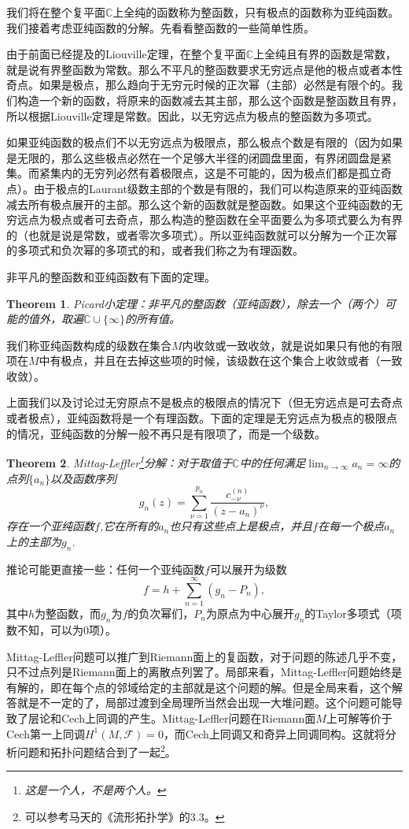 \documentclass[10pt]{book}
\theoremstyle{plain}%
\newtheorem{theo}{Theorem}[chapter]%
\begin{document}
我们将在整个复平面$\mathbb{C}$上全纯的函数称为整函数，只有极点的函数称为亚纯函数。我们接着考虑亚纯函数的分解。先看看整函数的一些简单性质。

由于前面已经提及的Liouville定理，在整个复平面$\mathbb{C}$上全纯且有界的函数是常数，就是说有界整函数为常数。那么不平凡的整函数要求无穷远点是他的极点或者本性奇点。如果是极点，那么趋向于无穷元时候的正次幂（主部）必然是有限个的。我们构造一个新的函数，将原来的函数减去其主部，那么这个函数是整函数且有界，所以根据Liouville定理是常数。因此，以无穷远点为极点的整函数为多项式。

如果亚纯函数的极点们不以无穷远点为极限点，那么极点个数是有限的（因为如果是无限的，那么这些极点必然在一个足够大半径的闭圆盘里面，有界闭圆盘是紧集。而紧集内的无穷列必然有着极限点，这是不可能的，因为极点们都是孤立奇点）。由于极点的Laurant级数主部的个数是有限的，我们可以构造原来的亚纯函数减去所有极点展开的主部。那么这个新的函数就是整函数。如果这个亚纯函数的无穷远点为极点或者可去奇点，那么构造的整函数在全平面要么为多项式要么为有界的（也就是说是常数，或者零次多项式）。所以亚纯函数就可以分解为一个正次幂的多项式和负次幂的多项式的和，或者我们称之为有理函数。

非平凡的整函数和亚纯函数有下面的定理。
\begin{theo}
Picard小定理：非平凡的整函数（亚纯函数），除去一个（两个）可能的值外，取遍$\mathbb{C}\cup\{\infty\}$的所有值。
\end{theo}
我们称亚纯函数构成的级数在集合$M$内收敛或一致收敛，就是说如果只有他的有限项在$M$中有极点，并且在去掉这些项的时候，该级数在这个集合上收敛或者（一致收敛）。

上面我们以及讨论过无穷原点不是极点的极限点的情况下（但无穷远点是可去奇点或者极点），亚纯函数将是一个有理函数。下面的定理是无穷远点为极点的极限点的情况，亚纯函数的分解一般不再只是有限项了，而是一个级数。
\begin{theo}
Mittag-Leffler\footnote{这是一个人，不是两个人。}分解：对于取值于$\mathbb{C}$中的任何满足$\lim_{n \to \infty} a_n = \infty$的点列$\{a_n\}$以及函数序列\[g_n(z)=\sum_{\nu=1}^{p_n}\frac{c^{(n)}_{-\nu}}{(z-a_n)^\nu},\]存在一个亚纯函数$f$,它在所有的$a_n$也只有这些点上是极点，并且$f$在每一个极点$a_n$上的主部为$g_n$.
\end{theo}
推论可能更直接一些：任何一个亚纯函数$f$可以展开为级数
\[
f=h+\sum_{n=1}^\infty(g_n-P_n),
\]
其中$h$为整函数，而$g_n$为$f$的负次幂们，$P_n$为原点为中心展开$g_n$的Taylor多项式（项数不知，可以为0项）。

Mittag-Leffler问题可以推广到Riemann面上的复函数，对于问题的陈述几乎不变，只不过点列是Riemann面上的离散点列罢了。局部来看，Mittag-Leffler问题始终是有解的，即在每个点的邻域给定的主部就是这个问题的解。但是全局来看，这个解答就是不一定的了，局部过渡到全局理所当然会出现一大堆问题。这个问题可能导致了层论和Cech上同调的产生。Mittag-Leffler问题在Riemann面$M$上可解等价于Cech第一上同调$H^1(M,\mathcal{F})=0$，而Cech上同调又和奇异上同调同构。这就将分析问题和拓扑问题结合到了一起\footnote{可以参考马天的《流形拓扑学》的3.3。}。
\end{document}

